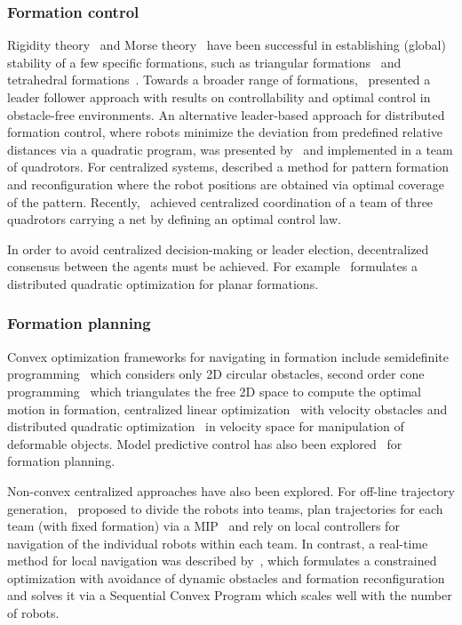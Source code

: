 \subsubsection{Formation control}
Rigidity theory~\cite{Eren.Belhumeur.ea:02} and Morse theory~\cite{Anderson:11} have been successful in establishing (global) stability of a few specific formations, such as triangular formations~\cite{Cao.Morse.ea:11} and tetrahedral formations~\cite{Anderson.Yu.ea:10}.
Towards a broader range of formations,~\cite{Ji:2006tr} presented a leader follower approach with results on controllability and optimal control in obstacle-free environments. An alternative leader-based approach for distributed formation control, where robots minimize the deviation from predefined relative distances via a quadratic program, was presented by~\cite{Turpin:2012uh} and implemented in a team of quadrotors.
For centralized systems, \cite{alonsomora12ijrr} described a method for pattern formation and reconfiguration where the robot positions are obtained via optimal coverage of the pattern. Recently,~\cite{Ritz:uc} achieved centralized coordination of a team of three quadrotors carrying a net by defining an optimal control law.

In order to avoid centralized decision-making or leader election, decentralized consensus between the agents must be achieved. For example~\cite{Montijano:2014bn} formulates a distributed quadratic optimization for planar formations.

\subsubsection{Formation planning}
Convex optimization frameworks for navigating in formation include semidefinite programming~\cite{Derenick:2010cc} which considers only 2D circular obstacles, second order cone programming~\cite{Derenick:ha} which triangulates the free 2D space to compute the optimal motion in formation, centralized linear optimization~\cite{Karamouzas:wm} with velocity obstacles and distributed quadratic optimization~\cite{AlonsoMora:2015wi} in velocity space for manipulation of deformable objects. Model predictive control has also been explored~\cite{Dunbar:2002fh} for formation planning.

Non-convex centralized approaches have also been explored. For off-line trajectory generation,~\cite{Kushleyev:2012wy} proposed to divide the robots into teams, plan trajectories for each team (with fixed formation) via a MIP~\cite{Mellinger:2012fi} and rely on local controllers for navigation of the individual robots within each team.
In contrast, a real-time method for local navigation was described by~\cite{alonsomora15iros}, which formulates a constrained optimization with avoidance of dynamic obstacles and formation reconfiguration and solves it via a Sequential Convex Program which scales well with the number of robots.










